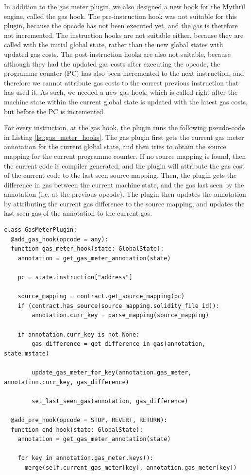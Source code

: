 In addition to the gas meter plugin, we also designed a new hook for the Mythril engine,
called the gas hook. The pre-instruction hook was not suitable
for this plugin, because the opcode has not been executed yet, and the gas is therefore not 
incremented. The instruction hooks are not suitable either, because they are called with the
initial global state, rather than the new global states with updated gas costs. The post-instruction
hooks are also not suitable, because although they had the updated gas costs after executing the
opcode, the programme counter (PC) has also been incremented to the next instruction, and therefore
we cannot attribute gas costs to the correct previous instruction that has used it. As such, 
we needed a new gas hook, which is called right after the machine state within the current
global state is updated with the latest gas costs, but before the PC is 
incremented.

For every instruction, at the gas hook, 
the plugin runs the following pseudo-code in Listing \ref{lst:gas_meter_hooks}. 
The gas plugin first gets the current gas meter annotation for the current global state,
and then tries to obtain the source mapping for the current programme counter. If no source
mapping is found, then the current code is compiler generated, and the plugin will
attribute the gas cost of the current code to the last seen source mapping. Then, 
the plugin gets the difference in gas between the current machine state, and the gas last
seen by the annotation (i.e. at the previous opcode). The plugin then updates the annotation
by attributing the current gas difference to the source mapping, and updates the last seen
gas of the annotation to the current gas.

\begin{lstlisting}[language=Pseudocode, caption={Hooks implemented for gas meter plugin}, label={lst:gas_meter_hooks}, basicstyle=\ttfamily\scriptsize]
class GasMeterPlugin:
  @add_gas_hook(opcode = any):
  function gas_meter_hook(state: GlobalState):
    annotation = get_gas_meter_annotation(state)
                
    pc = state.instruction["address"]
    
    source_mapping = contract.get_source_mapping(pc)
    if (contract.has_source(source_mapping.solidity_file_id)):
        annotation.curr_key = parse_mapping(source_mapping)
    
    if annotation.curr_key is not None:
        gas_difference = get_difference_in_gas(annotation, state.mstate)
        
        update_gas_meter_for_key(annotation.gas_meter, annotation.curr_key, gas_difference)

        set_last_seen_gas(annotation, gas_difference)

  @add_pre_hook(opcode = STOP, REVERT, RETURN):
  function end_hook(state: GlobalState):
    annotation = get_gas_meter_annotation(state)
                
    for key in annotation.gas_meter.keys():
      merge(self.current_gas_meter[key], annotation.gas_meter[key])
\end{lstlisting}

